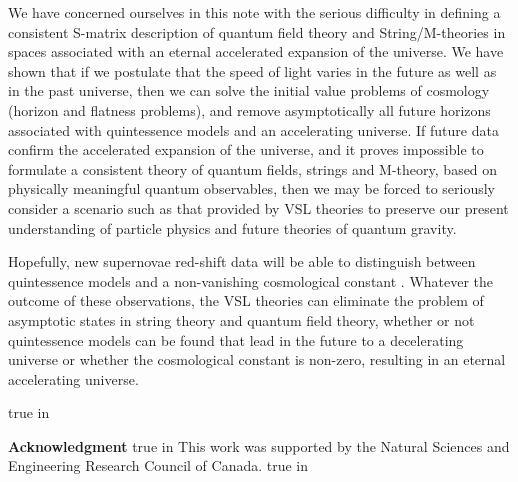 \documentclass[a4paper,12pt]{article}
\begin{document}
We have concerned ourselves in this note with the serious difficulty in
defining a consistent S-matrix description of quantum field theory and
String/M-theories in spaces
associated with an eternal accelerated expansion of the universe. We have
shown that if we postulate that the speed of light varies in the future as
well as in the past universe, then we can solve the initial value problems
of cosmology (horizon and flatness problems), and remove asymptotically all
future horizons associated with quintessence models and an accelerating
universe. If future data confirm the accelerated expansion of the universe,
and it proves impossible to formulate a consistent theory of quantum
fields, strings and M-theory, based on physically meaningful quantum
observables, then we may be forced to seriously consider a scenario such as
that provided by VSL theories to preserve our present understanding of
particle physics and future theories of quantum gravity.

Hopefully, new supernovae red-shift data will be able to distinguish
between quintessence models and a non-vanishing cosmological constant
\myHighlight{$\Lambda$}\coordHE{}. Whatever the outcome of these observations, the VSL
theories can eliminate the problem of asymptotic states in string
theory and quantum field theory, whether or not quintessence models can be
found that lead in the future to a decelerating universe or whether the
cosmological constant is non-zero, resulting in an eternal accelerating
universe.

 true in

{\bf Acknowledgment}
 true in
This work was supported by the Natural Sciences and Engineering Research
Council of Canada.
 true in
\end{document}
